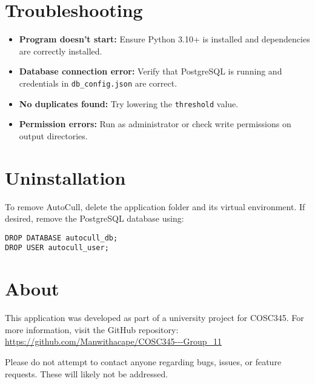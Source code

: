 \documentclass[12pt,a4paper]{article}
\begin{document}
\section{Troubleshooting}

\begin{itemize}
    \item \textbf{Program doesn’t start:}  
      Ensure Python 3.10+ is installed and dependencies are correctly installed.

    \item \textbf{Database connection error:}  
      Verify that PostgreSQL is running and credentials in \texttt{db\_config.json} are correct.

    \item \textbf{No duplicates found:}  
      Try lowering the \texttt{threshold} value.

    \item \textbf{Permission errors:}  
      Run as administrator or check write permissions on output directories.
\end{itemize}


\section{Uninstallation}

To remove AutoCull, delete the application folder and its virtual environment.  
If desired, remove the PostgreSQL database using:

\begin{lstlisting}[style=console]
DROP DATABASE autocull_db;
DROP USER autocull_user;
\end{lstlisting}


\section{About}

This application was developed as part of a university project for COSC345. For more information, visit the GitHub repository: \url{https://github.com/Manwithacape/COSC345---Group_11}

Please do not attempt to contact anyone regarding bugs, issues, or feature requests. These will likely not be addressed.
\end{document}
